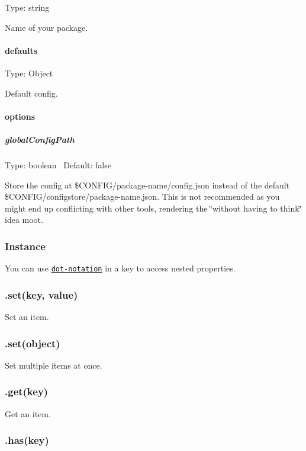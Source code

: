 Type\+: {\ttfamily string}

Name of your package.

\paragraph*{defaults}

Type\+: {\ttfamily Object}

Default config.

\paragraph*{options}

\subparagraph*{global\+Config\+Path}

Type\+: {\ttfamily boolean}~\newline
 Default\+: {\ttfamily false}

Store the config at {\ttfamily \$\+C\+O\+N\+F\+IG/package-\/name/config.json} instead of the default {\ttfamily \$\+C\+O\+N\+F\+IG/configstore/package-\/name.json}. This is not recommended as you might end up conflicting with other tools, rendering the \char`\"{}without having to think\char`\"{} idea moot.

\subsubsection*{Instance}

You can use \href{https://github.com/sindresorhus/dot-prop}{\tt dot-\/notation} in a {\ttfamily key} to access nested properties.

\subsubsection*{.set(key, value)}

Set an item.

\subsubsection*{.set(object)}

Set multiple items at once.

\subsubsection*{.get(key)}

Get an item.

\subsubsection*{.has(key)}


